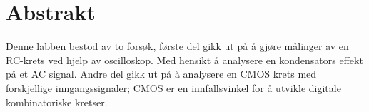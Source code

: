 \section{Abstrakt}

    Denne labben bestod av to forsøk, første del gikk ut på å gjøre målinger av en RC-krets ved hjelp av oscilloskop.
    Med hensikt å analysere en kondensators effekt på et AC signal.
    Andre del gikk ut på å analysere en CMOS krets med forskjellige inngangssignaler;
    CMOS er en innfallsvinkel for å utvikle digitale kombinatoriske kretser.